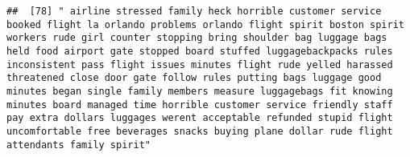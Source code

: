 \documentclass[
]{article}
\begin{document}
\begin{verbatim}
##  [78] " airline stressed family heck horrible customer service booked flight la orlando problems orlando flight spirit boston spirit workers rude girl counter stopping bring shoulder bag luggage bags held food airport gate stopped board stuffed luggagebackpacks rules inconsistent pass flight issues minutes flight rude yelled harassed threatened close door gate follow rules putting bags luggage good minutes began single family members measure luggagebags fit knowing minutes board managed time horrible customer service friendly staff pay extra dollars luggages werent acceptable refunded stupid flight uncomfortable free beverages snacks buying plane dollar rude flight attendants family spirit"                                                                                                                                                                                                                                                                                                                                                                                                                                                                                                                                                                                                                                                                                                                                                                                                                                                                                                                                                                                                                                                                           

\end{verbatim}
\end{document}
